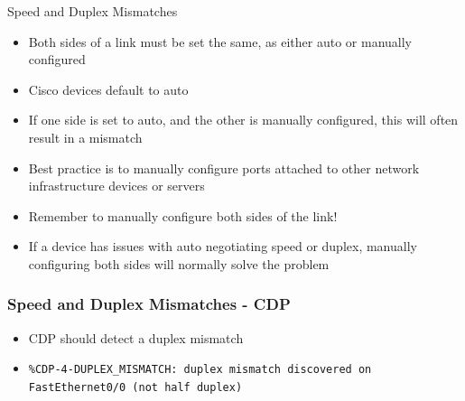 \documentclass[pdflatex,compress,mathserif]{beamer}
\begin{document}
\begin{frame}{Speed and Duplex Mismatches}
	\begin{itemize}
		\item Both sides of a link must be set the same, as either auto or manually configured
		\item Cisco devices default to auto
		\item If one side is set to auto, and the other is manually configured, this will often result in a mismatch
		\item Best practice is to manually configure ports attached to other network infrastructure devices or servers
		\item Remember to manually configure both sides of the link!
		\item If a device has issues with auto negotiating speed or duplex, manually configuring both sides will normally solve the problem
	\end{itemize}
\end{frame}

\begin{frame}
	\frametitle{Speed and Duplex Mismatches - CDP}
	\begin{itemize}
		\item CDP should detect a duplex mismatch
		\item[] \texttt{\%CDP-4-DUPLEX\_MISMATCH: duplex mismatch discovered on FastEthernet0/0 (not half duplex)}
	\end{itemize}
\end{frame}
\end{document}
